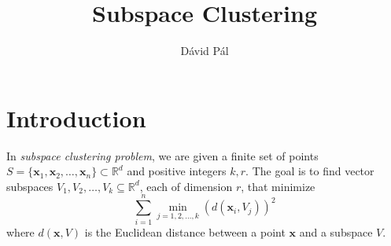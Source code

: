 \documentclass[12pt]{article}
\newcommand{\R}{\mathbb{R}}
\newcommand{\x}{\mathbf{x}}
\begin{document}
\title{Subspace Clustering}
\author{D\'avid P\'al}
\maketitle

\section{Introduction}

In \emph{subspace clustering problem}, we are given a finite set of points $S =
\{\x_1, \x_2, \dots, \x_n\} \subset \R^d$ and positive integers $k,r$.  The
goal is to find vector subspaces $V_1, V_2, \dots, V_k \subseteq \R^d$, each of
dimension $r$, that minimize
\begin{equation}
\label{equation:cost-function}
\sum_{i=1}^n \min_{j=1,2,\dots,k} \left( d(\x_i, V_j) \right)^2
\end{equation}
where $d(\x,V)$ is the Euclidean distance between a point $\x$ and a subspace
$V$.
\end{document}
